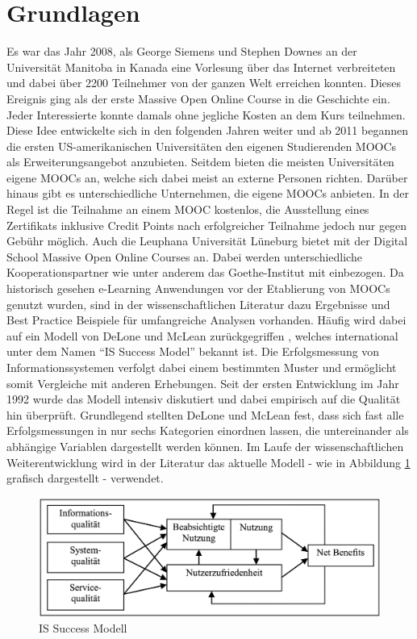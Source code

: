 \section{Grundlagen} %
\label{sec:grundlagen}
Es war das Jahr 2008, als George Siemens und Stephen Downes an der Universität Manitoba in Kanada eine Vorlesung über das Internet verbreiteten und dabei über 2200 Teilnehmer von der ganzen Welt erreichen konnten. Dieses Ereignis ging als der erste Massive Open Online Course in die Geschichte ein. Jeder Interessierte konnte damals ohne jegliche Kosten an dem Kurs teilnehmen. Diese Idee entwickelte sich in den folgenden Jahren weiter und ab 2011 begannen die ersten US-amerikanischen Universitäten den eigenen Studierenden MOOCs als Erweiterungsangebot anzubieten. Seitdem bieten die meisten Universitäten eigene MOOCs an, welche sich dabei meist an externe Personen richten. Darüber hinaus gibt es unterschiedliche Unternehmen, die eigene MOOCs anbieten. In der Regel ist die Teilnahme an einem MOOC kostenlos, die Ausstellung eines Zertifikats inklusive Credit Points nach erfolgreicher Teilnahme jedoch nur gegen Gebühr möglich.
\newline 
Auch die Leuphana Universität Lüneburg bietet mit der Digital School Massive Open Online Courses an. Dabei werden unterschiedliche Kooperationspartner wie unter anderem das Goethe-Institut mit einbezogen.
\newline 
Da historisch gesehen e-Learning Anwendungen vor der Etablierung von MOOCs genutzt wurden, sind in der wissenschaftlichen Literatur dazu Ergebnisse und Best Practice Beispiele für umfangreiche Analysen vorhanden. Häufig wird dabei auf ein Modell von DeLone und McLean zurückgegriffen \parencite[vgl.]{mohammadi2015factors, freeze2010success}, welches international unter dem Namen "`IS Success Model"' bekannt ist. Die Erfolgsmessung von Informationssystemen verfolgt dabei einem bestimmten Muster und ermöglicht somit Vergleiche mit anderen Erhebungen. Seit der ersten Entwicklung im Jahr 1992 wurde das Modell intensiv diskutiert und dabei empirisch auf die Qualität hin überprüft. Grundlegend stellten DeLone und McLean fest, dass sich fast alle Erfolgsmessungen in nur sechs Kategorien einordnen lassen, die untereinander als abhängige Variablen dargestellt werden können. Im Laufe der wissenschaftlichen Weiterentwicklung wird in der Literatur das aktuelle Modell - wie in Abbildung \ref{IS Success Model} grafisch dargestellt - verwendet. \parencite[vgl.]{delone2002information}

\begin{figure}[h]
\centering
\includegraphics[width=1\textwidth]{Grafiken/issuccess.png}
\caption{IS Success Modell}
\label{IS Success Model}
\end{figure}


